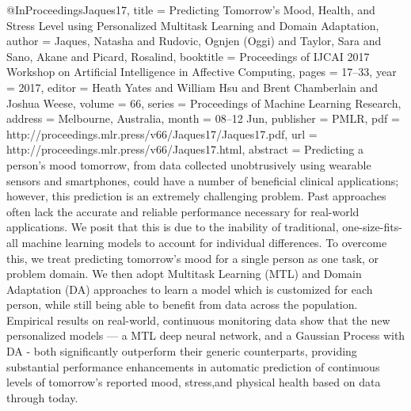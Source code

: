 {@InProceedings{Jaques17,
  title = {Predicting Tomorrow's Mood, Health, and Stress Level using Personalized Multitask Learning and Domain Adaptation},
  author = {Jaques, Natasha and Rudovic, Ognjen (Oggi) and Taylor, Sara and Sano, Akane and Picard, Rosalind},
  booktitle = {Proceedings of IJCAI 2017 Workshop on Artificial Intelligence in Affective Computing},
  pages = 	 {17--33},
  year = 	 {2017},
  editor =    {Heath Yates and William Hsu and Brent Chamberlain and Joshua Weese},
  volume = 	 {66},
  series = 	 {Proceedings of Machine Learning Research},
  address =  {Melbourne, Australia},
  month = 	 {08--12 Jun},
  publisher = {PMLR},
  pdf = 	 {http://proceedings.mlr.press/v66/Jaques17/Jaques17.pdf},
  url = 	 {http://proceedings.mlr.press/v66/Jaques17.html},
  abstract = {Predicting a person’s mood tomorrow, from data collected unobtrusively using wearable sensors and smartphones, could have a number of beneﬁcial clinical applications; however, this prediction is an extremely challenging problem. Past approaches often lack the accurate and reliable performance necessary for real-world applications. We posit that this is due to the inability of traditional, one-size-fits-all machine learning models to account for individual diﬀerences. To overcome this, we treat predicting tomorrow’s mood for a single person as one task, or problem domain. We then adopt Multitask Learning (MTL) and Domain Adaptation (DA) approaches to learn a model which is customized for each person, while still being able to beneﬁt from data across the population. Empirical results on real-world, continuous monitoring data show that the new personalized models — a MTL deep neural network, and a Gaussian Process with DA - both signiﬁcantly outperform their generic counterparts, providing substantial performance enhancements in automatic prediction of continuous levels of tomorrow’s reported mood, stress,and physical health based on data through today.}
}

}
